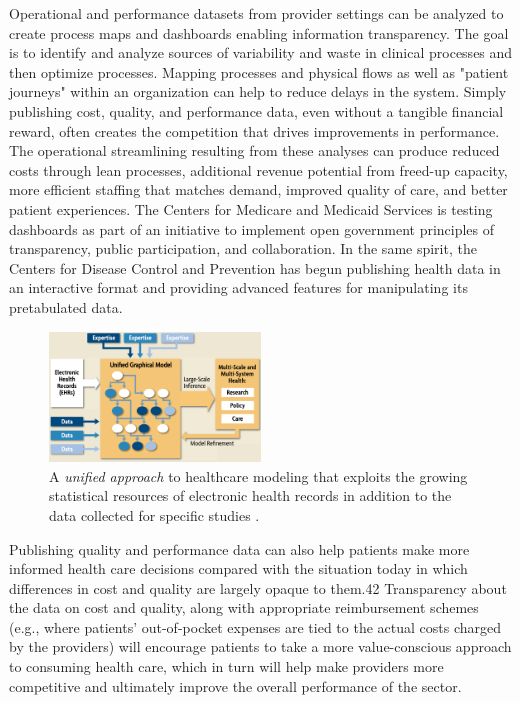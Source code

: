 \documentclass[twocolumn]{article}
\begin{document}
Operational and performance datasets from provider settings can be analyzed to create process maps and dashboards enabling information transparency. The goal is to identify and analyze sources of variability and waste in clinical processes and then optimize processes. Mapping processes and physical flows as well as "patient journeys" within an organization can help to reduce delays in the system. Simply publishing cost, quality, and performance data, even without a tangible financial reward, often creates the competition that drives improvements in performance. The operational streamlining resulting from these analyses can produce reduced costs through lean processes, additional revenue potential from freed-up capacity, more efficient staffing that matches demand, improved quality of care, and better patient experiences. The Centers for Medicare and Medicaid Services is testing dashboards as part of an initiative to implement open government principles of transparency, public participation, and collaboration. In the same spirit, the Centers for Disease Control and Prevention has begun publishing health data in an interactive format and providing advanced features for manipulating its pretabulated data.

\begin{figure}[htb]
        \centering
        \includegraphics[width=0.5\textwidth]{model.png}
        \caption{A \textit{unified approach} to healthcare modeling that exploits the growing statistical resources of electronic health records in addition to the data collected for specific studies \cite{Hey:2009}.}
        \label{fig:model}
\end{figure}

Publishing quality and performance data can also help patients make more informed health care decisions compared with the situation today in which differences in cost and quality are largely opaque to them.42 Transparency about the data on cost and quality, along with appropriate reimbursement schemes (e.g., where patients’ out-of-pocket expenses are tied to the actual costs charged by the providers) will encourage patients to take a more value-conscious approach to consuming health care, which in turn will help make providers more competitive and ultimately improve the overall performance of the sector.
\end{document}
